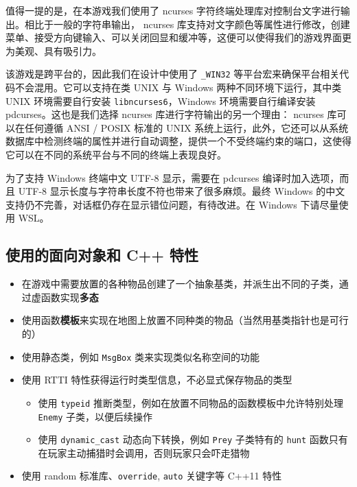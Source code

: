 \documentclass[hyperref,UTF8,a4paper]{ctexart}
\providecommand{\tightlist}{%
  \setlength{\itemsep}{0pt}\setlength{\parskip}{0pt}}
\begin{document}
值得一提的是，在本游戏我们使用了 ncurses
字符终端处理库对控制台文字进行输出。相比于一般的字符串输出， ncurses
库支持对文字颜色等属性进行修改，创建菜单、接受方向键输入、可以关闭回显和缓冲等，这便可以使得我们的游戏界面更为美观、具有吸引力。

该游戏是跨平台的，因此我们在设计中使用了 \texttt{\_WIN32}
等平台宏来确保平台相关代码不会混用。它可以支持在类 UNIX 与 Windows
两种不同环境下运行，其中类 UNIX 环境需要自行安装
\texttt{libncurses6}，Windows 环境需要自行编译安装
pdcurses。这也是我们选择 ncurses 库进行字符输出的另一个理由： ncurses
库可以在任何遵循 ANSI / POSIX 标准的 UNIX
系统上运行，此外，它还可以从系统数据库中检测终端的属性并进行自动调整，提供一个不受终端约束的端口，这使得它可以在不同的系统平台与不同的终端上表现良好。

为了支持 Windows 终端中文 UTF-8 显示，需要在 pdcurses
编译时加入选项，而且 UTF-8
显示长度与字符串长度不符也带来了很多麻烦。最终 Windows
的中文支持仍不完善，对话框仍存在显示错位问题，有待改进。在 Windows
下请尽量使用 WSL。

\hypertarget{ux4f7fux7528ux7684ux9762ux5411ux5bf9ux8c61ux548c-c-ux7279ux6027}{%
\subsection{使用的面向对象和 C++
特性}\label{ux4f7fux7528ux7684ux9762ux5411ux5bf9ux8c61ux548c-c-ux7279ux6027}}

\begin{itemize}
\tightlist
\item
  在游戏中需要放置的各种物品创建了一个抽象基类，并派生出不同的子类，通过虚函数实现\textbf{多态}
\item
  使用函数\textbf{模板}来实现在地图上放置不同种类的物品（当然用基类指针也是可行的）
\item
  使用静态类，例如 \texttt{MsgBox} 类来实现类似名称空间的功能
\item
  使用 RTTI 特性获得运行时类型信息，不必显式保存物品的类型

  \begin{itemize}
  \tightlist
  \item
    使用 \texttt{typeid}
    推断类型，例如在放置不同物品的函数模板中允许特别处理 \texttt{Enemy}
    子类，以便后续操作
  \item
    使用 \texttt{dynamic\_cast} 动态向下转换，例如 \texttt{Prey}
    子类特有的 \texttt{hunt}
    函数只有在玩家主动捕猎时会调用，否则玩家只会吓走猎物
  \end{itemize}
\item
  使用 random 标准库、\texttt{override}, \texttt{auto} 关键字等 C++11
  特性
\end{itemize}
\end{document}
